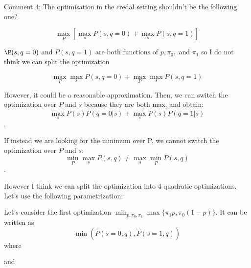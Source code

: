 \documentclass[runningheads]{llncs}
\begin{document}
	
		Comment 4: The optimisation in the credal setting shouldn't be the following one?
	
	$$\max_P [\max_s P(s,q=0)+\max_s P(s,q=1)]$$ 
	
	$\P(s,q=0)$ and $P(s,q=1)$ are both functions of $p, \pi_0,$ and $\pi_1$ so I do not 
	think we can split the optimization
	
	$$\max_P \max_s P(s,q=0)+\max_P\max_s P(s,q=1)$$ 
	
	However, it could be a reasonable approximation. Then, we can switch the optimization 
	over $P$ and $s$ because they are both max, and obtain: 
	$$\max_s \overline{P}(s)\overline{P}(q=0|s)+\max_s  \overline{P}(s)\overline{P}(q=1|s)$$.
	
	If instead we are looking for the minimum over P, we cannot switch the optimization 
	over $P$ and $s$:
	$$\min_P \max_s P(s,q) \neq \max_s \min_P P(s,q)$$.
	
	However I think we can split the optimization into 4 quadratic optimizations.
	Let's use the following parametrization:
	
	Let's consider the first optimization $\min_{p,\pi_0,\pi_1}  \max\{\pi_1 p, \pi_0 (1-p)\}$. It 
	can be written as
	$$ \min(\tilde{P}(s=0,q),\tilde{P}(s=1,q)) $$ 
	where 

	and 
	
\end{document}
